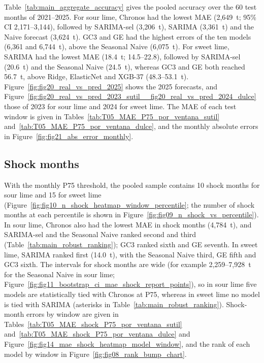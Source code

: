 \documentclass[forecasting,article,submit,moreauthors]{Definitions/mdpi}
\begin{document}
Table~\ref{tab:main_aggregate_accuracy} gives the pooled accuracy over the 60 test months of 2021--2025. For sour lime, Chronos had the lowest MAE (2,649~t; 95\% CI 2,171--3,144), followed by SARIMA-sel (3,206~t), SARIMA (3,361~t) and the Naive forecast (3,624~t). GC3 and GE had the highest errors of the ten models (6,361 and 6,744~t), above the Seasonal Naive (6,075~t). For sweet lime, SARIMA had the lowest MAE (18.4~t; 14.5--22.8), followed by SARIMA-sel (20.6~t) and the Seasonal Naive (24.5~t), whereas GC3 and GE both reached 56.7~t, above Ridge, ElasticNet and XGB-37 (48.3--53.1~t). Figure~\ref{fig:fig20_real_vs_pred_2025} shows the 2025 forecasts, and Figure~\ref{fig:fig20_real_vs_pred_2023_sutil__fig20_real_vs_pred_2024_dulce} those of 2023 for sour lime and 2024 for sweet lime. The MAE of each test window is given in Tables~\ref{tab:T05_MAE_P75_por_ventana_sutil} and~\ref{tab:T05_MAE_P75_por_ventana_dulce}, and the monthly absolute errors in Figure~\ref{fig:fig21_abs_error_monthly}.

\subsection{Shock months}
With the monthly P75 threshold, the pooled sample contains 10 shock months for sour lime and 15 for sweet lime (Figure~\ref{fig:fig10_n_shock_heatmap_window_percentile}; the number of shock months at each percentile is shown in Figure~\ref{fig:fig09_n_shock_vs_percentile}). In sour lime, Chronos also had the lowest MAE in shock months (4,784~t), and SARIMA-sel and the Seasonal Naive ranked second and third (Table~\ref{tab:main_robust_ranking}); GC3 ranked sixth and GE seventh. In sweet lime, SARIMA ranked first (14.0~t), with the Seasonal Naive third, GE fifth and GC3 sixth. The intervals for shock months are wide (for example 2,259--7,928~t for the Seasonal Naive in sour lime; Figure~\ref{fig:fig11_bootstrap_ci_mae_shock_report_points}), so in sour lime five models are statistically tied with Chronos at P75, whereas in sweet lime no model is tied with SARIMA (asterisks in Table~\ref{tab:main_robust_ranking}). Shock-month errors by window are given in Tables~\ref{tab:T05_MAE_shock_P75_por_ventana_sutil} and~\ref{tab:T05_MAE_shock_P75_por_ventana_dulce} and Figure~\ref{fig:fig14_mae_shock_heatmap_model_window}, and the rank of each model by window in Figure~\ref{fig:fig08_rank_bump_chart}.
\end{document}
